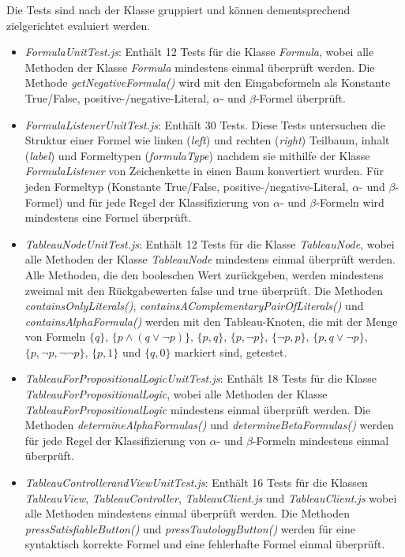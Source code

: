 Die Tests sind nach der Klasse gruppiert und können dementsprechend zielgerichtet evaluiert werden.
\begin{itemize}

\item \textit{FormulaUnitTest.js}: Enthält 12 Tests für die Klasse \textit{Formula}, wobei alle Methoden der Klasse \textit{Formula} mindestens einmal überprüft werden. Die Methode \textit{getNegativeFormula()} wird mit den Eingabeformeln als Konstante True/False, positive-/negative-Literal, $\alpha $- und  $\beta $-Formel überprüft.

\item \textit{FormulaListenerUnitTest.js}: Enthält 30 Tests. Diese Tests untersuchen die Struktur einer Formel wie linken (\textit{left}) und rechten (\textit{right}) Teilbaum, inhalt (\textit{label}) und Formeltypen (\textit{formulaType}) nachdem sie mithilfe der Klasse \textit{FormulaListener} von Zeichenkette in einen Baum konvertiert wurden. Für jeden Formeltyp (Konstante True/False, positive-/negative-Literal, $ \alpha $- und  $ \beta $-Formel) und für jede Regel der Klassifizierung von $\alpha$- und $\beta$-Formeln wird mindestens eine Formel überprüft.

\item \textit{TableauNodeUnitTest.js}: Enthält 12 Tests für die Klasse \textit{TableauNode}, wobei alle Methoden der Klasse \textit{TableauNode} mindestens einmal überprüft werden. Alle Methoden, die den booleschen Wert zurückgeben, werden mindestens zweimal mit den Rückgabewerten false und true überprüft. Die Methoden \textit{containsOnlyLiterals()}, \textit{containsAComplementaryPairOfLiterals()} und \textit{containsAlphaFormula()} werden mit den Tableau-Knoten, die mit der Menge von Formeln $\{q\}$, $\{p\wedge(q\vee\neg p)\}$, $\{p,q\}$, $\{p,\neg p\}$, $\{\neg p,p\}$, $ \{p,q\vee\neg p\} $, $\{p,\neg p,\neg\neg p\}$, $\{p,1\}$ und $\{q,0\}$ markiert sind, getestet.

\item \textit{TableauForPropositionalLogicUnitTest.js}: Enthält 18 Tests für die Klasse \textit{TableauForPropositionalLogic}, wobei alle Methoden der Klasse \textit{TableauForPropositionalLogic} mindestens einmal überprüft werden. Die Methoden \textit {determineAlphaFormulas()} und \textit{determineBetaFormulas()} werden für jede Regel der Klassifizierung von $\alpha$- und $\beta$-Formeln mindestens einmal überprüft.

\item \textit{TableauControllerandViewUnitTest.js}: Enthält 16 Tests für die Klassen \textit{TableauView}, \textit{TableauController}, \textit{TableauClient.js} und \textit{TableauClient.js} wobei alle Methoden mindestens einmal überprüft werden. Die Methoden \textit { pressSatisfiableButton()} und \textit{pressTautologyButton()} werden für eine syntaktisch korrekte Formel und eine fehlerhafte Formel einmal überprüft.
\end{itemize}


